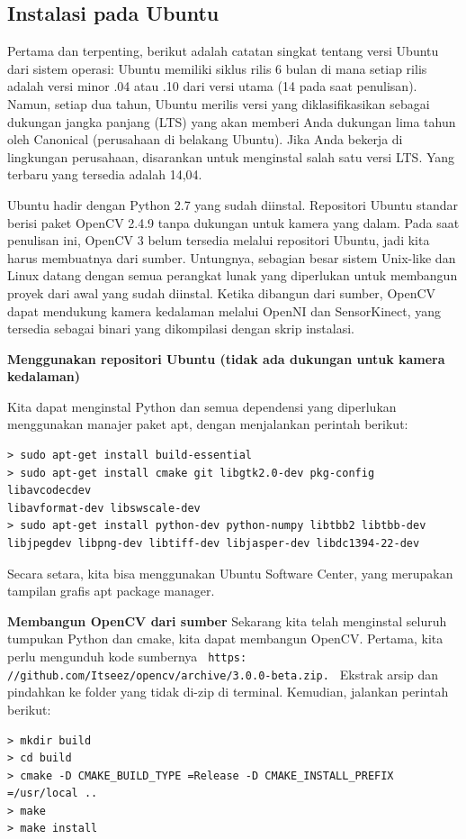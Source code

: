 \begin{enumerate}
\begin{enumerate}
\newpage
\subsection {Instalasi pada Ubuntu}

Pertama dan terpenting, berikut adalah catatan singkat tentang versi Ubuntu dari sistem operasi: Ubuntu memiliki siklus rilis 6 bulan di mana setiap rilis adalah versi minor .04 atau .10 dari versi utama (14 pada saat penulisan). Namun, setiap dua tahun, Ubuntu merilis versi yang diklasifikasikan sebagai dukungan jangka panjang (LTS) yang akan memberi Anda dukungan lima tahun oleh Canonical (perusahaan di belakang Ubuntu). Jika Anda bekerja di lingkungan perusahaan, disarankan untuk menginstal salah satu versi LTS. Yang terbaru yang tersedia adalah 14,04.


Ubuntu hadir dengan Python 2.7 yang sudah diinstal. Repositori Ubuntu standar berisi paket OpenCV 2.4.9 tanpa dukungan untuk kamera yang dalam. Pada saat penulisan ini, OpenCV 3 belum tersedia melalui repositori Ubuntu, jadi kita harus membuatnya dari sumber. Untungnya, sebagian besar sistem Unix-like dan Linux datang dengan semua perangkat lunak yang diperlukan untuk membangun proyek dari awal yang sudah diinstal. Ketika dibangun dari sumber, OpenCV dapat mendukung kamera kedalaman melalui OpenNI dan SensorKinect, yang tersedia sebagai binari yang dikompilasi dengan skrip instalasi.

\par
\textbf {Menggunakan repositori Ubuntu (tidak ada dukungan untuk kamera kedalaman)}

Kita dapat menginstal Python dan semua dependensi yang diperlukan menggunakan manajer paket apt, dengan menjalankan perintah berikut:
\begin{verbatim}
> sudo apt-get install build-essential
> sudo apt-get install cmake git libgtk2.0-dev pkg-config libavcodecdev
libavformat-dev libswscale-dev
> sudo apt-get install python-dev python-numpy libtbb2 libtbb-dev libjpegdev libpng-dev libtiff-dev libjasper-dev libdc1394-22-dev 
\end{verbatim}
Secara setara, kita bisa menggunakan Ubuntu Software Center, yang merupakan tampilan grafis apt package manager.

\newpage
\textbf {Membangun OpenCV dari sumber}
Sekarang kita telah menginstal seluruh tumpukan Python dan cmake, kita dapat membangun OpenCV.
Pertama, kita perlu mengunduh kode sumbernya
\verb| https: //github.com/Itseez/opencv/archive/3.0.0-beta.zip. |
Ekstrak arsip dan pindahkan ke folder yang tidak di-zip di terminal.
Kemudian, jalankan perintah berikut:
\begin{verbatim}
> mkdir build
> cd build
> cmake -D CMAKE_BUILD_TYPE =Release -D CMAKE_INSTALL_PREFIX =/usr/local ..
> make
> make install 
\end{verbatim}


\end{enumerate}
\end{enumerate}
